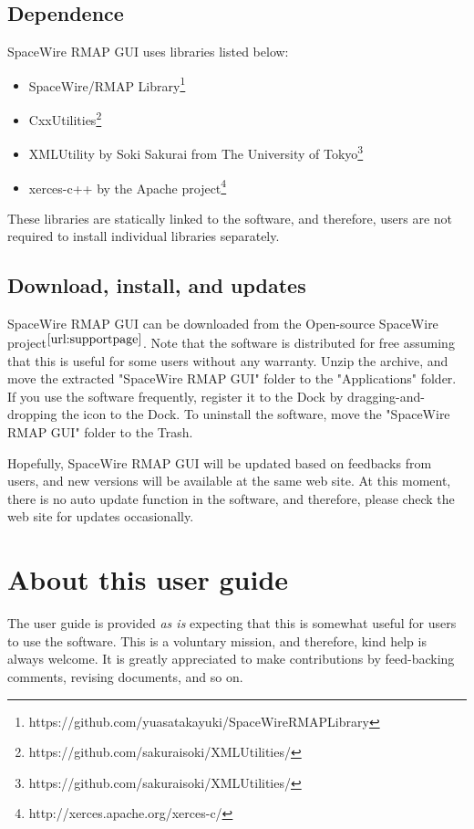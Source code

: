 \documentclass[a4paper,10pt]{article}
\begin{document}
\subsection{Dependence}
SpaceWire RMAP GUI uses libraries listed below:
\begin{itemize}
  \setlength{\parskip}{0cm}
  \setlength{\itemsep}{0cm}
\item SpaceWire/RMAP Library\footnote{https://github.com/yuasatakayuki/SpaceWireRMAPLibrary}
\item CxxUtilities\footnote{https://github.com/sakuraisoki/XMLUtilities/}
\item XMLUtility by Soki Sakurai from The University of Tokyo\footnote{https://github.com/sakuraisoki/XMLUtilities/}
\item xerces-c++ by the Apache project\footnote{http://xerces.apache.org/xerces-c/}
\end{itemize}
These libraries are statically linked to the software, and therefore, users are not required to install individual libraries separately.

\subsection{Download, install, and updates}
SpaceWire RMAP GUI can be downloaded from the Open-source SpaceWire project$^\mathrm{\ref{url:supportpage}}$.
Note that the software is distributed for free assuming that this is useful for some users without any warranty.
Unzip the archive, and move the extracted "SpaceWire RMAP GUI" folder to the "Applications" folder.
If you use the software frequently, register it to the Dock by dragging-and-dropping the icon to the Dock. To uninstall the software, move the "SpaceWire RMAP GUI" folder to the Trash.

Hopefully, SpaceWire RMAP GUI will be updated based on feedbacks from users, and new versions will be available at the same web site. At this moment, there is no auto update function in the software, and therefore, please check the web site for updates occasionally.


\section{About this user guide}
The user guide is provided {\it as is} expecting that this is somewhat useful for users to use the software. This is a voluntary mission, and therefore, kind help is always welcome. It is greatly appreciated to make contributions by feed-backing comments, revising documents, and so on.
\end{document}
